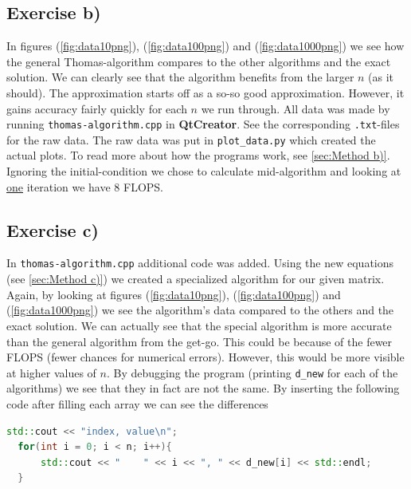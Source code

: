 \documentclass{article}
\begin{document}
  \subsection{Exercise b)} \label{sec:Results b)}

    In figures (\ref{fig:data10png}), (\ref{fig:data100png}) and (\ref{fig:data1000png}) we see how the general Thomas-algorithm compares to the other algorithms and the exact solution. We can clearly see that the algorithm benefits from the larger $n$ (as it should). The approximation starts off as a so-so good approximation. However, it gains accuracy fairly quickly for each $n$ we run through. All data was made by running \texttt{thomas-algorithm.cpp} in \textbf{QtCreator}. See the corresponding \texttt{.txt}-files for the raw data. The raw data was put in \texttt{plot\_data.py} which created the actual plots. To read more about how the programs work, see
    \ref{sec:Method b)}.\\

    Ignoring the initial-condition we chose to calculate mid-algorithm and looking at \underline{one} iteration we have 8 FLOPS.

  \subsection{Exercise c)} \label{sec:Results c)}

    In \texttt{thomas-algorithm.cpp} additional code was added. Using the new equations (see \ref{sec:Method c)}) we created a specialized algorithm for our given matrix. Again, by looking at figures (\ref{fig:data10png}), (\ref{fig:data100png}) and (\ref{fig:data1000png}) we see the algorithm's data compared to the others and the exact solution. We can actually see that the special algorithm is more accurate than the general algorithm from the get-go. This could be because of the fewer FLOPS (fewer chances for numerical errors). However, this would be more visible at higher values of $n$. By debugging the program (printing \texttt{d\_new} for each of the algorithms) we see that they in fact are not the same. By inserting the following code after filling each array we can see the differences \\

  \begin{lstlisting}[language=C++]
    std::cout << "index, value\n";
  for(int i = 0; i < n; i++){
      std::cout << "    " << i << ", " << d_new[i] << std::endl;
  }
  \end{lstlisting}
\end{document}
